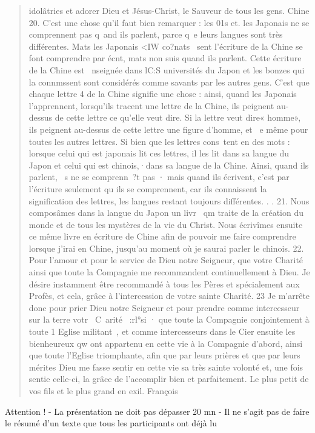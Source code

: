 \begin{quote}
    idolâtries et adorer Dieu et Jésus-Christ, le Sauveur de tous les
gens. Chine
20. C'est une chose qu'il faut bien remarquer : les 01s et.
les Japonais ne se comprennent pas q~and ils parlent, parce q~e
leurs langues sont très différentes. Mats les Japonais <IW co?nats~
sent l'écriture de la Chine se font comprendre par écnt, mats non suis
quand ils parlent. Cette écriture de la Chine est ~nseignée dans lC:S
universités du Japon et les bonzes qui la connmssent sont considérés
comme savants par les autres gens. C'est que chaque lettre 4
de la Chine signifie une chose : ainsi, quand les Japonais l'apprennent,
lorsqu'ils tracent une lettre de la Chine, ils peignent au-dessus
de cette lettre ce qu'elle veut dire. Si la lettre veut dire« homme»,
ils peignent au-dessus de cette lettre une figure d'homme, et ~e
même pour toutes les autres lettres. Si bien que les lettres cons~tent
en des mots : lorsque celui qui est japonais lit ces lettres, il
les lit dans sa langue du Japon et celui qui est chinois,·dans sa langue
de la Chine. Ainsi, quand ils parlent, ~s ne se comprenn~?t
pas · mais quand ils écrivent, c'est par l'écriture seulement qu ils
se comprennent, car ils connaissent la signification des lettres, les
langues restant toujours différentes. . .
21. Nous composâmes dans la langue du Japon un livr~ qm
traite de la création du monde et de tous les mystères de la vie du
Christ. Nous écrivîmes ensuite ce même livre en écriture de Chine
afin de pouvoir me faire comprendre lorsque j'irai en Chine,
jusqu'au moment où je saurai parler le chinois.
22. Pour l'amour et pour le service de Dieu notre Seigneur, que
votre Charité ainsi que toute la Compagnie me recommandent
continuellement à Dieu. Je désire instamment être recommandé à
tous les Pères et spécialement aux Profès, et cela, grâce à l'intercession
de votre sainte Charité.
23 Je m'arrête donc pour prier Dieu notre Seigneur et pour
prendre comme intercesseur sur la terre votr~ C~arité~ :rl°si · que
toute la Compagnie conjointement à toute 1 Eglise militant~, et
comme intercesseurs dans le Cier ensuite les bienheureux qw ont
appartenu en cette vie à la Compagnie d'abord, ainsi que toute
l'Eglise triomphante, afin que par leurs prières et que par leurs
mérites Dieu me fasse sentir en cette vie sa très sainte volonté et,
une fois sentie celle-ci, la grâce de l'accomplir bien et parfaitement.
Le plus petit de vos fils et le plus grand en exil.
François
\end{quote}

Attention !
-	La présentation ne doit pas dépasser 20 mn
-	Il ne s’agit pas de faire le résumé d’un texte que tous les participants ont déjà lu

